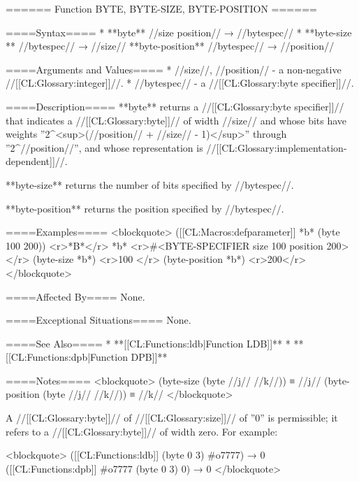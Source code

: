 ====== Function BYTE, BYTE-SIZE, BYTE-POSITION ======

====Syntax====
  * **byte** //size position// → //bytespec//
  * **byte-size ** //bytespec// → //size// **byte-position** //bytespec// → //position//

====Arguments and Values====
  * //size//, //position// - a non-negative //[[CL:Glossary:integer]]//.
  * //bytespec// - a //[[CL:Glossary:byte specifier]]//.

====Description====
**byte** returns a //[[CL:Glossary:byte specifier]]// that indicates a //[[CL:Glossary:byte]]// of width //size// and whose bits have weights ''2^<sup>(//position// + //size// - 1)</sup>'' through ''2^//position//'', and whose representation is //[[CL:Glossary:implementation-dependent]]//.

**byte-size** returns the number of bits specified by //bytespec//.

**byte-position** returns the position specified by //bytespec//.

====Examples====
<blockquote> 
([[CL:Macros:defparameter]] *b* (byte 100 200)) <r>*B*</r>
*b* <r>#<BYTE-SPECIFIER size 100 position 200> </r>
(byte-size *b*) <r>100 </r>
(byte-position *b*) <r>200</r>
</blockquote>

====Affected By====
None.

====Exceptional Situations====
None.

====See Also====
  * **[[CL:Functions:ldb|Function LDB]]**
  * **[[CL:Functions:dpb|Function DPB]]**

====Notes====
<blockquote>
(byte-size (byte //j// //k//)) ≡ //j//
(byte-position (byte //j// //k//)) ≡ //k//
</blockquote>

A //[[CL:Glossary:byte]]// of //[[CL:Glossary:size]]// of ''0'' is permissible; it refers to a //[[CL:Glossary:byte]]// of width zero. For example:

<blockquote>
([[CL:Functions:ldb]] (byte 0 3) #o7777) → 0 
([[CL:Functions:dpb]] #o7777 (byte 0 3) 0) → 0
</blockquote>
